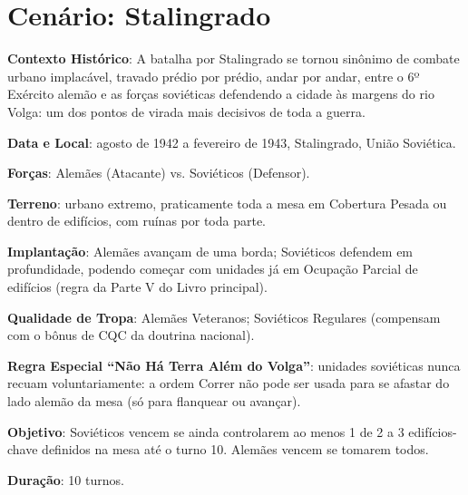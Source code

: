 \documentclass[11pt]{article}
\begin{document}
\section{Cenário: Stalingrado}

\textbf{Contexto Histórico}: A batalha por Stalingrado se tornou sinônimo de combate urbano implacável, travado prédio por prédio, andar por andar, entre o 6º Exército alemão e as forças soviéticas defendendo a cidade às margens do rio Volga: um dos pontos de virada mais decisivos de toda a guerra.

\textbf{Data e Local}: agosto de 1942 a fevereiro de 1943, Stalingrado, União Soviética.

\textbf{Forças}: Alemães (Atacante) vs. Soviéticos (Defensor).

\textbf{Terreno}: urbano extremo, praticamente toda a mesa em Cobertura Pesada ou dentro de edifícios, com ruínas por toda parte.

\textbf{Implantação}: Alemães avançam de uma borda; Soviéticos defendem em profundidade, podendo começar com unidades já em Ocupação Parcial de edifícios (regra da Parte V do Livro principal).

\textbf{Qualidade de Tropa}: Alemães Veteranos; Soviéticos Regulares (compensam com o bônus de CQC da doutrina nacional).

\textbf{Regra Especial ``Não Há Terra Além do Volga''}: unidades soviéticas nunca recuam voluntariamente: a ordem Correr não pode ser usada para se afastar do lado alemão da mesa (só para flanquear ou avançar).

\textbf{Objetivo}: Soviéticos vencem se ainda controlarem ao menos 1 de 2 a 3 edifícios-chave definidos na mesa até o turno 10. Alemães vencem se tomarem todos.

\textbf{Duração}: 10 turnos.
\end{document}
